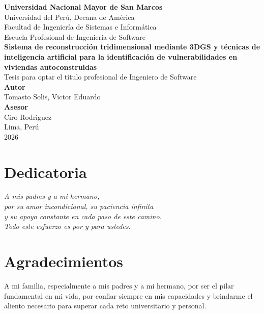 \documentclass[12pt,oneside]{report}
\begin{document}
\begin{titlepage}
  \centering
  {\Large \textbf{Universidad Nacional Mayor de San Marcos}}\\[0.4cm]
  {\large Universidad del Perú, Decana de América}\\[0.4cm]
  {\large Facultad de Ingeniería de Sistemas e Informática}\\[0.2cm]
  {\large Escuela Profesional de Ingeniería de Software}\\[1.8cm]


  {\Large \textbf{Sistema de reconstrucción tridimensional mediante 3DGS y técnicas de inteligencia artificial para la identificación de vulnerabilidades en viviendas autoconstruidas}}\\[1.5cm]

  {\large Tesis para optar el título profesional de Ingeniero de Software}\\[1.2cm]

  {\large \textbf{Autor}}\\[0.2cm]
  {\large Tomasto Solis, Victor Eduardo}\\[0.8cm]

  {\large \textbf{Asesor}}\\[0.2cm]
  {\large Ciro Rodriguez}\\[1.5cm]

  {\large Lima, Perú}\\[0.2cm]
  {\large 2026}
\end{titlepage}

\clearpage
{}

\chapter*{Dedicatoria}
\begin{flushright}
\itshape
A mis padres y a mi hermano,\\
por su amor incondicional, su paciencia infinita\\
y su apoyo constante en cada paso de este camino.\\
Todo este esfuerzo es por y para ustedes.
\end{flushright}

\chapter*{Agradecimientos}
A mi familia, especialmente a mis padres y a mi hermano, por ser el pilar fundamental en mi vida, por confiar siempre en mis capacidades y brindarme el aliento necesario para superar cada reto universitario y personal.
\end{document}
